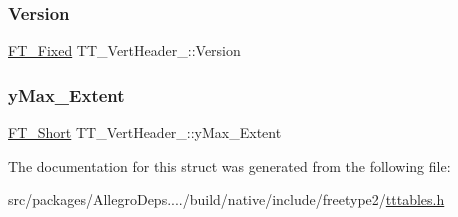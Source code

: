 \subsubsection{\texorpdfstring{Version}{Version}}
{\footnotesize\ttfamily \hyperlink{fttypes_8h_a5f5a679cc09f758efdd0d1c5feed3c3d}{F\+T\+\_\+\+Fixed} T\+T\+\_\+\+Vert\+Header\+\_\+\+::\+Version}

\mbox{\label{struct_t_t___vert_header___af6927e95c1dfbe90c2e76b1eef521d53}} 
\subsubsection{\texorpdfstring{y\+Max\+\_\+\+Extent}{yMax\_Extent}}
{\footnotesize\ttfamily \hyperlink{fttypes_8h_aa7279be89046a2563cd3d4d6651fbdcf}{F\+T\+\_\+\+Short} T\+T\+\_\+\+Vert\+Header\+\_\+\+::y\+Max\+\_\+\+Extent}



The documentation for this struct was generated from the following file\+:\begin{DoxyCompactItemize}
\item 
src/packages/\+Allegro\+Deps..../build/native/include/freetype2/\hyperlink{tttables_8h}{tttables.\+h}\end{DoxyCompactItemize}
